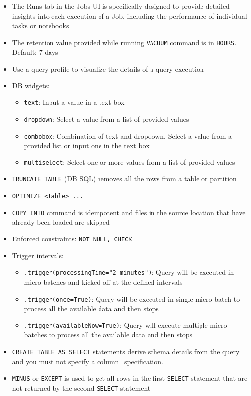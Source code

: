 \documentclass[11pt]{scrartcl}
\begin{document}
\begin{itemize}
	\item The Runs tab in the Jobs UI is specifically designed to provide detailed insights into each execution of a Job, including the performance of individual tasks or notebooks
	\item The retention value provided while running \texttt{VACUUM} command is in \texttt{HOURS}. Default: 7 days
	\item Use a query profile to visualize the details of a query execution
	\item DB widgets:
	\begin{itemize}
		\item \texttt{text}: Input a value in a text box
		\item \texttt{dropdown}: Select a value from a list of provided values
		\item \texttt{combobox}: Combination of text and dropdown. Select a value from a provided list or input one in the text box
		\item \texttt{multiselect}: Select one or more values from a list of provided values
	\end{itemize}
	\item \texttt{TRUNCATE TABLE} (DB SQL) removes all the rows from a table or partition
	\item \texttt{OPTIMIZE <table> ...}
	\item \texttt{COPY INTO} command is idempotent and files in the source location that have already been loaded are skipped
	\item Enforced constraints: \texttt{NOT NULL, CHECK}
	\item Trigger intervals:
	\begin{itemize}
		\item \texttt{.trigger(processingTime="2 minutes")}: Query will be executed in micro-batches and kicked-off at the defined intervals
		\item \texttt{.trigger(once=True)}: Query will be executed in single micro-batch to process all the available data and then stops
		\item \texttt{.trigger(availableNow=True)}: Query will execute multiple micro-batches to process all the available data and then stops
	\end{itemize}
	\item \texttt{CREATE TABLE AS SELECT} statements derive schema details from the query and you must not specify a column\_specification.
	\item \texttt{MINUS} or \texttt{EXCEPT} is used to get all rows in the first \texttt{SELECT} statement that are not returned by the second \texttt{SELECT} statement

\end{itemize}
\end{document}
